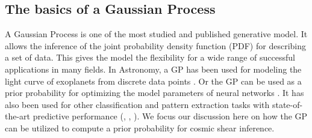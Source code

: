 \subsection{The basics of a Gaussian Process}
A Gaussian Process is one of the most studied and published 
generative model. It allows the inference of the joint probability density 
function (PDF) for describing a set of data. 
This gives the model the flexibility for a wide range
of successful applications in many fields. 
In Astronomy, a GP has been used for modeling 
the light curve of exoplanets from discrete data points \citep{Ambikasaran2014a}.
Or the GP can be used as a prior probability for optimizing the model parameters of
neural networks \citep{Snoek2012}. 
It has also been used for other classification and pattern extraction tasks
with state-of-the-art predictive performance 
(\citealt{Wilson2013}, \citealt{Duvenaud2013}, \citealt{Rasmussen2006}).
We focus our discussion here on how the GP can be utilized to compute a prior
probability for cosmic shear inference.
 
